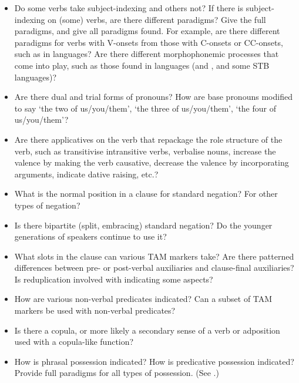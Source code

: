 \begin{itemize}
	\item	Do some verbs take subject-indexing
				and others not? If there is subject-indexing on (some) verbs,
				are there different paradigms? Give the full paradigms,
				and give all paradigms found.
				For example, are there different paradigms for verbs with V-onsets
				from those with C-onsets or CC-onsets,
				such as in  languages? Are there different morphophonemic
				processes that come into play,
				such as those found in  languages (and ,
				and some STB languages)?

	\item	Are there dual
				and trial forms of pronouns? How are base pronouns modified to
				say ‘the two of us/you/them’,
				‘the three of us/you/them’,
				‘the four of us/you/them’?

	\item	Are there applicatives on the verb that repackage the role
				structure of the verb,
				such as transitivise intransitive verbs,
				verbalise nouns, increase the valence by making the verb causative,
				decrease the valence by incorporating arguments,
				indicate dative raising, etc.?

	\item	What is the normal position in a clause for standard negation?
				For other types of negation?

	\item	Is there bipartite (split,
				embracing) standard negation? Do the younger generations of speakers
				continue to use it?

	\item	What slots in the clause can various TAM markers take? Are
				there patterned differences between pre- or post-verbal auxiliaries
				and clause-final auxiliaries? Is reduplication involved with
				indicating some aspects?
				
	\item	How are various non-verbal predicates indicated? Can a subset
				of TAM markers be used with non-verbal predicates?

	\item	Is there a copula,
				or more likely a secondary sense of a verb or adposition used
				with a copula-like function?

	\item	How is phrasal possession indicated? How is predicative possession
				indicated? Provide full paradigms for all types of possession.
				(See .)
	

\end{itemize}
